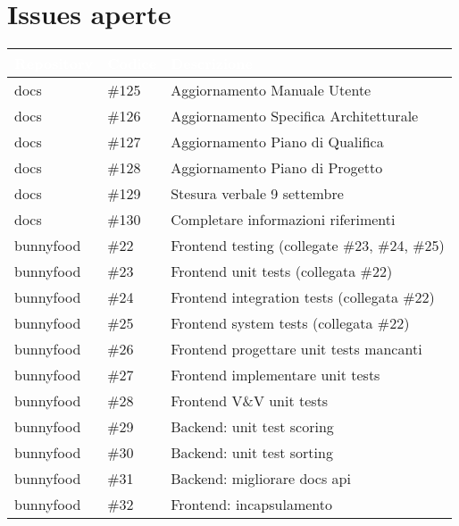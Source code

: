 \documentclass{classes/base}
\begin{document}
    \section*{Issues aperte}
    {
        
        \newlength{\freewidth}
        \setlength{\freewidth}{\dimexpr\textwidth-10\tabcolsep}
        \renewcommand{\arraystretch}{1.5}
        \centering
        \setlength{\aboverulesep}{0pt}
        \setlength{\belowrulesep}{0pt}
        \begin{longtable}{C{.17\freewidth} C{.13\freewidth} C{.761\freewidth}}
            \toprule
        \textcolor{white}{\textbf{Repository}}&
        \textcolor{white}{\textbf{Codice}}&
        \textcolor{white}{\textbf{Descrizione}}\\	
        \toprule
        \endhead
        
        docs & \#125 & Aggiornamento Manuale Utente \\
        docs & \#126 & Aggiornamento Specifica Architetturale \\
        docs & \#127 & Aggiornamento Piano di Qualifica \\
        docs & \#128 & Aggiornamento Piano di Progetto \\
        docs & \#129 & Stesura verbale 9 settembre \\
        docs & \#130 & Completare informazioni riferimenti \\
        bunnyfood & \#22 & Frontend testing (collegate \#23, \#24, \#25) \\
        bunnyfood & \#23 & Frontend unit tests (collegata \#22) \\
        bunnyfood & \#24 & Frontend integration tests (collegata \#22) \\
        bunnyfood & \#25 & Frontend system tests (collegata \#22) \\
        bunnyfood & \#26 & Frontend progettare unit tests mancanti \\
        bunnyfood & \#27 & Frontend implementare unit tests \\
        bunnyfood & \#28 & Frontend V\&V unit tests \\
        bunnyfood & \#29 & Backend: unit test scoring \\
        bunnyfood & \#30 & Backend: unit test sorting \\
        bunnyfood & \#31 & Backend: migliorare docs api \\
        bunnyfood & \#32 & Frontend: incapsulamento \\

        \bottomrule
        \end{longtable}
    }
\end{document}
